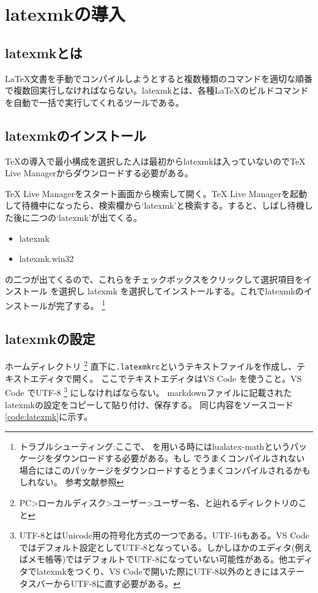 \documentclass[titlepage]{ltjsarticle}
\begin{document}
\section{latexmkの導入} 
\subsection{latexmkとは}
\LaTeX 文書を手動でコンパイルしようとすると複数種類のコマンドを適切な順番で複数回実行しなければならない。latexmkとは、各種\LaTeX のビルドコマンドを自動で一括で実行してくれるツールである。

\subsection{latexmkのインストール}

TeXの導入で最小構成を選択した人は最初からlatexmkは入っていないのでTeX Live Managerからダウンロードする必要がある。

TeX Live Managerをスタート画面から検索して開く。TeX Live Managerを起動して待機中になったら、検索欄から`latexmk'と検索する。すると、しばし待機した後に二つの`latexmk'が出てくる。
\begin{itemize}
  \item latexmk
  \item latexmk.win32
\end{itemize}
の二つが出てくるので、これらをチェックボックスをクリックして選択項目をインストール を選択し latexmk を選択してインストールする。これでlatexmkのインストールが完了する。
\footnote{トラブルシューティング:ここで、\LuaLaTeX 
を用いる時にはlualatex-mathというパッケージをダウンロードする必要がある。もし\LuaLaTeX 
でうまくコンパイルされない場合にはこのパッケージをダウンロードするとうまくコンパイルされるかもしれない。
参考文献\cite{TeXliveトラブルシューティングlualatex}参照}

\subsection{latexmkの設定}
ホームディレクトリ
\footnote{
  PC>ローカルディスク>ユーザー>ユーザー名、と辿れるディレクトリのこと
}
直下に\verb|.latexmkrc|というテキストファイルを作成し、テキストエディタで開く。
ここでテキストエディタはVS Code を使うこと。VS Code でUTF-8
\footnote{UTF-8とはUnicode用の符号化方式の一つである。UTF-16もある。VS Codeではデフォルト設定としてUTF-8となっている。しかしほかのエディタ(例えばメモ帳等)ではデフォルトでUTF-8になっていない可能性がある。他エディタでlatexmkをつくり、VS Codeで開いた際にUTF-8以外のときにはステータスバーからUTF-8に直す必要がある。\cite{VSCodeの文字コード}}
にしなければならない。
markdownファイルに記載されたlatexmkの設定をコピーして貼り付け、保存する。
同じ内容をソースコード\ref{code:latexmk}に示す。
\end{document}
